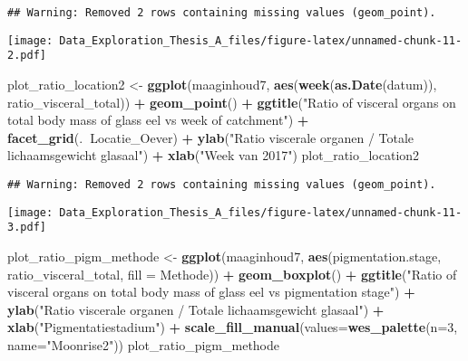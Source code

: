 \documentclass[]{article}
\newenvironment{Shaded}{\begin{snugshade}}{\end{snugshade}}
\newcommand{\KeywordTok}[1]{\textcolor[rgb]{0.13,0.29,0.53}{\textbf{#1}}}
\newcommand{\DataTypeTok}[1]{\textcolor[rgb]{0.13,0.29,0.53}{#1}}
\newcommand{\DecValTok}[1]{\textcolor[rgb]{0.00,0.00,0.81}{#1}}
\newcommand{\StringTok}[1]{\textcolor[rgb]{0.31,0.60,0.02}{#1}}
\newcommand{\OperatorTok}[1]{\textcolor[rgb]{0.81,0.36,0.00}{\textbf{#1}}}
\newcommand{\NormalTok}[1]{#1}
\begin{document}
\begin{verbatim}
## Warning: Removed 2 rows containing missing values (geom_point).
\end{verbatim}

\texttt{[image: Data\_Exploration\_Thesis\_A\_files/figure-latex/unnamed-chunk-11-2.pdf]}

\begin{Shaded}
\begin{Highlighting}[]
\NormalTok{plot_ratio_location2 <-}\StringTok{ }\KeywordTok{ggplot}\NormalTok{(maaginhoud7, }\KeywordTok{aes}\NormalTok{(}\KeywordTok{week}\NormalTok{(}\KeywordTok{as.Date}\NormalTok{(datum)), ratio_visceral_total)) }\OperatorTok{+}
\StringTok{  }\KeywordTok{geom_point}\NormalTok{() }\OperatorTok{+}
\StringTok{  }\KeywordTok{ggtitle}\NormalTok{(}\StringTok{"Ratio of visceral organs on total body mass of glass eel vs week of catchment"}\NormalTok{) }\OperatorTok{+}
\StringTok{  }\KeywordTok{facet_grid}\NormalTok{(.}\OperatorTok{~}\NormalTok{Locatie_Oever) }\OperatorTok{+}
\StringTok{  }\KeywordTok{ylab}\NormalTok{(}\StringTok{"Ratio viscerale organen / Totale lichaamsgewicht glasaal"}\NormalTok{) }\OperatorTok{+}
\StringTok{  }\KeywordTok{xlab}\NormalTok{(}\StringTok{"Week van 2017"}\NormalTok{)}
\NormalTok{plot_ratio_location2}
\end{Highlighting}
\end{Shaded}

\begin{verbatim}
## Warning: Removed 2 rows containing missing values (geom_point).
\end{verbatim}

\texttt{[image: Data\_Exploration\_Thesis\_A\_files/figure-latex/unnamed-chunk-11-3.pdf]}

\begin{Shaded}
\begin{Highlighting}[]
\NormalTok{plot_ratio_pigm_methode <-}\StringTok{ }\KeywordTok{ggplot}\NormalTok{(maaginhoud7, }\KeywordTok{aes}\NormalTok{(pigmentation.stage, ratio_visceral_total, }\DataTypeTok{fill =}\NormalTok{ Methode)) }\OperatorTok{+}
\StringTok{  }\KeywordTok{geom_boxplot}\NormalTok{() }\OperatorTok{+}
\StringTok{  }\KeywordTok{ggtitle}\NormalTok{(}\StringTok{"Ratio of visceral organs on total body mass of glass eel vs pigmentation stage"}\NormalTok{) }\OperatorTok{+}
\StringTok{  }\KeywordTok{ylab}\NormalTok{(}\StringTok{"Ratio viscerale organen / Totale lichaamsgewicht glasaal"}\NormalTok{) }\OperatorTok{+}
\StringTok{  }\KeywordTok{xlab}\NormalTok{(}\StringTok{"Pigmentatiestadium"}\NormalTok{) }\OperatorTok{+}
\StringTok{  }\KeywordTok{scale_fill_manual}\NormalTok{(}\DataTypeTok{values=}\KeywordTok{wes_palette}\NormalTok{(}\DataTypeTok{n=}\DecValTok{3}\NormalTok{, }\DataTypeTok{name=}\StringTok{"Moonrise2"}\NormalTok{))  }
\NormalTok{plot_ratio_pigm_methode}
\end{Highlighting}
\end{Shaded}
\end{document}
